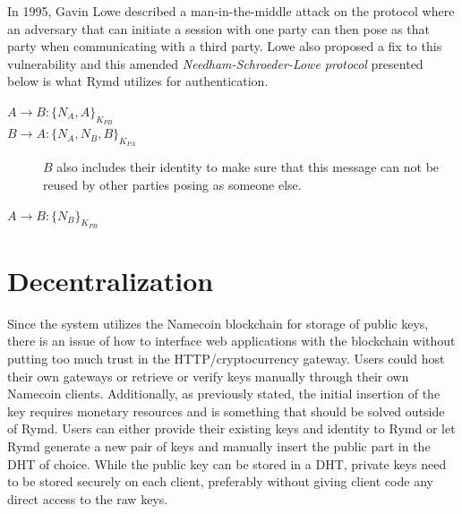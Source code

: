In 1995, Gavin Lowe described a man-in-the-middle attack on the protocol where an adversary that can initiate a session with one party can then pose as that party when communicating with a third party\cite{Lowe:1995}. Lowe also proposed a fix to this vulnerability and this amended \emph{Needham-Schroeder-Lowe protocol} presented below is what Rymd utilizes for authentication.

\begin{description}
  \item[$A \rightarrow B: \{N_A, A\}_{K_{PB}}$]
  \item[$B \rightarrow A: \{N_A, N_B, B\}_{K_{PA}}$] $B$ also includes their identity to make sure that this message can not be reused by other parties posing as someone else.
  \item[$A \rightarrow B: \{N_B\}_{K_{PB}}$]
\end{description}

\section{Decentralization}
Since the system utilizes the Namecoin blockchain for storage of public keys, there is an issue of how to interface web applications with the blockchain without putting too much trust in the HTTP/cryptocurrency gateway. Users could host their own gateways or retrieve or verify keys manually through their own Namecoin clients. Additionally, as previously stated, the initial insertion of the key requires monetary resources and is something that should be solved outside of Rymd. Users can either provide their existing keys and identity to Rymd or let Rymd generate a new pair of keys and manually insert the public part in the DHT of choice.
While the public key can be stored in a DHT, private keys need to be stored securely on each client, preferably without giving client code any direct access to the raw keys.

